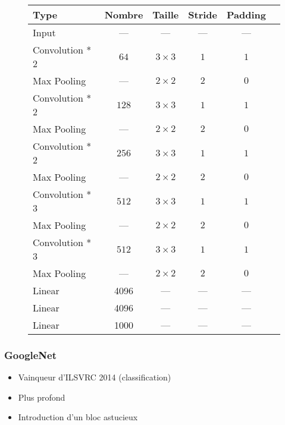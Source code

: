 \documentclass{formation}
\begin{document}
\begin{frame}
  \begin{figure}
    \centering
    \begin{tabular}{lccccc}
      \toprule
      Type            & Nombre & Taille       & Stride & Padding \\
      \midrule
      Input           & ---    & ---          & ---    & ---     \\
      \rowcolor{green}
      Convolution * 2 & $64$   & $3 \times 3$ & $1$    & $1$     \\
      \rowcolor{red}
      Max Pooling     & ---    & $2 \times 2$ & $2$    & $0$     \\
      \rowcolor{green}
      Convolution * 2 & $128$  & $3 \times 3$ & $1$    & $1$     \\
      \rowcolor{red}
      Max Pooling     & ---    & $2 \times 2$ & $2$    & $0$     \\
      \rowcolor{green}
      Convolution * 2 & $256$  & $3 \times 3$ & $1$    & $1$     \\
      \rowcolor{red}
      Max Pooling     & ---    & $2 \times 2$ & $2$    & $0$     \\
      \rowcolor{green}
      Convolution * 3 & $512$  & $3 \times 3$ & $1$    & $1$     \\
      \rowcolor{red}
      Max Pooling     & ---    & $2 \times 2$ & $2$    & $0$     \\
      \rowcolor{green}
      Convolution * 3 & $512$  & $3 \times 3$ & $1$    & $1$     \\
      \rowcolor{red}
      Max Pooling     & ---    & $2 \times 2$ & $2$    & $0$     \\
      \rowcolor{yellow}
      Linear          & 4096   & ---          & ---    & ---     \\
      \rowcolor{yellow}
      Linear          & 4096   & ---          & ---    & ---     \\
      \rowcolor{yellow}
      Linear          & 1000   & ---          & ---    & ---     \\
      \bottomrule
    \end{tabular}
  \end{figure}
\end{frame}

\begin{frame}
  \frametitle{GoogleNet}
  \begin{itemize}
  \item Vainqueur d'ILSVRC 2014 (classification)~\cite{Szegedy2015}
  \item Plus profond
  \item Introduction d'un bloc astucieux
  \end{itemize}
\end{frame}
\end{document}
